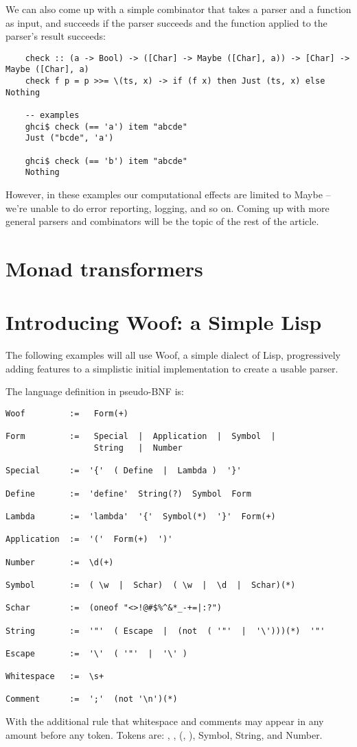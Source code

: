 \documentclass{tmr}
\begin{document}
We can also come up with a simple combinator that takes a parser and a function
as input, and succeeds if the parser succeeds and the function applied to the
parser's result succeeds:
\begin{verbatim}
    check :: (a -> Bool) -> ([Char] -> Maybe ([Char], a)) -> [Char] -> Maybe ([Char], a)
    check f p = p >>= \(ts, x) -> if (f x) then Just (ts, x) else Nothing
    
    -- examples
    ghci$ check (== 'a') item "abcde"
    Just ("bcde", 'a')
    
    ghci$ check (== 'b') item "abcde"
    Nothing
\end{verbatim}
However, in these examples our computational effects are limited to Maybe -- we're
unable to do error reporting, logging, and so on.  Coming up with more general 
parsers and combinators will be the topic of the rest of the article.


\section{Monad transformers}

\section{Introducing Woof:  a Simple Lisp}

The following examples will all use Woof, a simple dialect of Lisp,
progressively adding features to a simplistic initial implementation
to create a usable parser.

The language definition in pseudo-BNF is:

\begin{verbatim}
Woof         :=   Form(+)

Form         :=   Special  |  Application  |  Symbol  |  
                  String   |  Number

Special      :=  '{'  ( Define  |  Lambda )  '}'

Define       :=  'define'  String(?)  Symbol  Form

Lambda       :=  'lambda'  '{'  Symbol(*)  '}'  Form(+)

Application  :=  '('  Form(+)  ')'

Number       :=  \d(+)

Symbol       :=  ( \w  |  Schar)  ( \w  |  \d  |  Schar)(*)

Schar        :=  (oneof "<>!@#$%^&*_-+=|:?")

String       :=  '"'  ( Escape  |  (not  ( '"'  |  '\')))(*)  '"'

Escape       :=  '\'  ( '"'  |  '\' )

Whitespace   :=  \s+

Comment      :=  ';'  (not '\n')(*)
\end{verbatim}
With the additional rule that whitespace and comments 
may appear in any amount before any token.
Tokens are:  {, }, (, ), Symbol, String, and Number.
\end{document}
